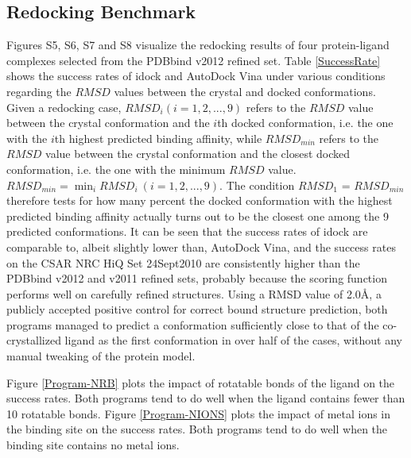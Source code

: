 \documentclass[10pt]{article}
\begin{document}
\subsection*{Redocking Benchmark}
Figures S5, S6, S7 and S8 visualize the redocking results of four protein-ligand complexes selected from the PDBbind v2012 refined set. Table \ref{SuccessRate} shows the success rates of idock and AutoDock Vina under various conditions regarding the $RMSD$ values between the crystal and docked conformations. Given a redocking case, $RMSD_i (i = 1,2,...,9)$ refers to the $RMSD$ value between the crystal conformation and the $i$th docked conformation, i.e. the one with the $i$th highest predicted binding affinity, while $RMSD_{min}$ refers to the $RMSD$ value between the crystal conformation and the closest docked conformation, i.e. the one with the minimum $RMSD$ value. $RMSD_{min} = \displaystyle\min_{i}RMSD_i\ (i = 1,2,...,9)$. The condition $RMSD_1$ = $RMSD_{min}$ therefore tests for how many percent the docked conformation with the highest predicted binding affinity actually turns out to be the closest one among the 9 predicted conformations. It can be seen that the success rates of idock are comparable to, albeit slightly lower than, AutoDock Vina, and the success rates on the CSAR NRC HiQ Set 24Sept2010 are consistently higher than the PDBbind v2012 and v2011 refined sets, probably because the scoring function performs well on carefully refined structures. Using a RMSD value of 2.0\AA, a publicly accepted positive control for correct bound structure prediction, both programs managed to predict a conformation sufficiently close to that of the co-crystallized ligand as the first conformation in over half of the cases, without any manual tweaking of the protein model.

Figure \ref{Program-NRB} plots the impact of rotatable bonds of the ligand on the success rates. Both programs tend to do well when the ligand contains fewer than 10 rotatable bonds. Figure \ref{Program-NIONS} plots the impact of metal ions in the binding site on the success rates. Both programs tend to do well when the binding site contains no metal ions.
\end{document}
